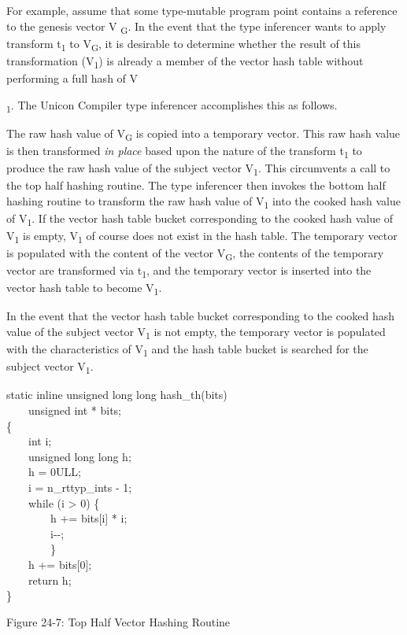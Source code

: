 For example, assume that some type-mutable program point contains a
reference to the genesis vector V {\textsubscript{G}}. In the event
that the type inferencer wants to apply transform t{\textsubscript{1}}
to V{\textsubscript{G}}, it is desirable to determine whether the
result of this transformation (V{\textsubscript{1}}) is already a
member of the vector hash table without performing a full hash of
V{\textsubscript{1}. The Unicon Compiler type inferencer accomplishes
this as follows.

The raw hash value of V{\textsubscript{G}} is copied into a temporary
vector. This raw hash value is then transformed {\textit{in place}}
based upon the nature of the transform t{\textsubscript{1}} to produce
the raw hash value of the subject vector V{\textsubscript{1}}. This
circumvents a call to the top half hashing routine. The type
inferencer then invokes the bottom half hashing routine to transform
the raw hash value of V{\textsubscript{1}} into the cooked hash value
of V{\textsubscript{1}}. If the vector hash table bucket corresponding
to the cooked hash value of V{\textsubscript{1}} is empty,
V{\textsubscript{1}} of course does not exist in the hash table.  The
temporary vector is populated with the content of the vector
V{\textsubscript{G}}, the contents of the temporary vector are
transformed via t{\textsubscript{1}}, and the temporary vector is
inserted into the vector hash table to become
V{\textsubscript{1}}.

In the event that the vector hash table bucket corresponding to the
cooked hash value of the subject vector V{\textsubscript{1}} is not
empty, the temporary vector is populated with the characteristics of
V{\textsubscript{1}} and the hash table bucket is searched for the
subject vector V{\textsubscript{1}}.


\bigskip

\begin{iconcode}
static inline unsigned long long hash\_th(bits) \\
\ \ \ \ unsigned int * bits; \\
\{ \\
\ \ \ \ int i; \\
\ \ \ \ unsigned long long h; \\
\ \ \ \ h = 0ULL; \\
\ \ \ \ i = n\_rttyp\_ints - 1; \\
\ \ \ \ while (i {\textgreater} 0) \{ \\
\ \ \ \ \ \ \ \ h += bits[i] * i; \\
\ \ \ \ \ \ \ \ i-{}-; \\
\ \ \ \ \ \ \ \ \} \\
\ \ \ \ h += bits[0]; \\
\ \ \ \ return h; \\
\}
\end{iconcode}
{\centering
Figure 24-7: Top Half Vector Hashing Routine
\par}

}
